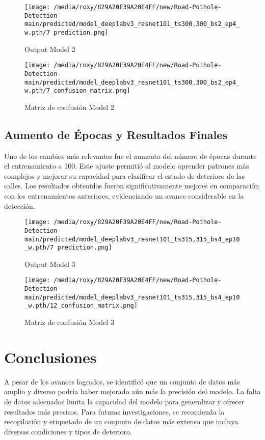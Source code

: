 \documentclass{article}
\begin{document}
\begin{figure}
    \centering
    \texttt{[image: /media/roxy/829A20F39A20E4FF/new/Road-Pothole-Detection-main/predicted/model\_deeplabv3\_resnet101\_ts300,300\_bs2\_ep4\_w.pth/7 prediction.png]} %
    \caption{Output Model 2} %
    \label{fig:input} %
\end{figure}

\begin{figure} 
    \centering
    \texttt{[image: /media/roxy/829A20F39A20E4FF/new/Road-Pothole-Detection-main/predicted/model\_deeplabv3\_resnet101\_ts300,300\_bs2\_ep4\_w.pth/7\_confusion\_matrix.png]} %
    \caption{Matriz de confusión Model 2} %
    \label{fig:matriz_confusion} %
\end{figure}


\subsection{Aumento de Épocas y Resultados Finales}
Uno de los cambios más relevantes fue el aumento del número de épocas durante el entrenamiento a 100. Este ajuste permitió al modelo aprender patrones más complejos y mejorar su capacidad para clasificar el estado de deterioro de las calles. Los resultados obtenidos fueron significativamente mejores en comparación con los entrenamientos anteriores, evidenciando un avance considerable en la detección.

\begin{figure}
    \centering
    \texttt{[image: /media/roxy/829A20F39A20E4FF/new/Road-Pothole-Detection-main/predicted/model\_deeplabv3\_resnet101\_ts315,315\_bs4\_ep10\_w.pth/7 prediction.png]} %
    \caption{Output Model 3} %
    \label{fig:input} %
\end{figure}

\begin{figure} 
    \centering
    \texttt{[image: /media/roxy/829A20F39A20E4FF/new/Road-Pothole-Detection-main/predicted/model\_deeplabv3\_resnet101\_ts315,315\_bs4\_ep10\_w.pth/12\_confusion\_matrix.png]} %
    \caption{Matriz de confusión Model 3} %
    \label{fig:matriz_confusion} %
\end{figure}

\section{Conclusiones}
A pesar de los avances logrados, se identificó que un conjunto de datos más amplio y diverso podría haber mejorado aún más la precisión del modelo. La falta de datos adecuados limita la capacidad del modelo para generalizar y ofrecer resultados más precisos. Para futuras investigaciones, se recomienda la recopilación y etiquetado de un conjunto de datos más extenso que incluya diversas condiciones y tipos de deterioro.
\end{document}

